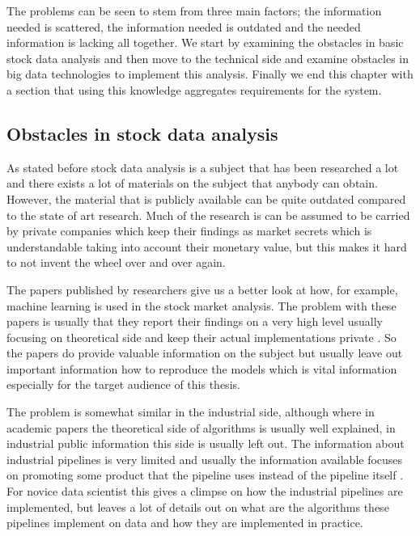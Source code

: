 The problems can be seen to stem from three main factors; the information needed is scattered, the information needed is outdated and the needed information is lacking all together.
We start by examining the obstacles in basic stock data analysis and then move to the technical side and examine obstacles in big data technologies to implement this analysis.
Finally we end this chapter with a section that using this knowledge aggregates requirements for the system.

\subsection{Obstacles in stock data analysis}

As stated before stock data analysis is a subject that has been researched a lot and there exists a lot of materials on the subject that anybody can obtain.
However, the material that is publicly available can be quite outdated compared to the state of art research.
Much of the research is can be assumed to be carried by private companies which keep their findings as market secrets which is understandable taking into account their monetary value, but this makes it hard to not invent the wheel over and over again.

The papers published by researchers give us a better look at how, for example, machine learning is used in the stock market analysis.
The problem with these papers is usually that they report their findings on a very high level usually focusing on theoretical side and keep their actual implementations private \cite{le} \cite{adresic} \cite{islam}.
So the papers do provide valuable information on the subject but usually leave out important information how to reproduce the models which is vital information especially for the target audience of this thesis.

The problem is somewhat similar in the industrial side, although where in academic papers the theoretical side of algorithms is usually well explained, in industrial public information this side is usually left out.
The information about industrial pipelines is very limited and usually the information available focuses on promoting some product that the pipeline uses instead of the pipeline itself \cite{palmer} \cite{snively}.
For novice data scientist this gives a climpse on how the industrial pipelines are implemented, but leaves a lot of details out on what are the algorithms these pipelines implement on data and how they are implemented in practice.

